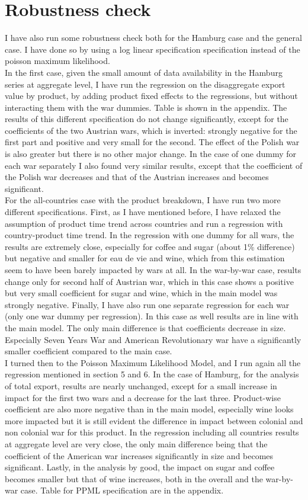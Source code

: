 \documentclass[12pt,a4paper,titlepage,english]{article}
\begin{document}
\section{Robustness check}
I have also run some robustness check both for the Hamburg case and the general case. I have done so by using a log linear specification specification instead of the poisson maximum likelihood. \\
In the first case, given the small amount of data availability in the Hamburg series at aggregate level, I have run the regression on the disaggregate export value by product, by adding product fixed effects to the regressions, but without interacting them with the war dummies. Table is shown in the appendix. The results of this different specification do not change significantly, except for the coefficients of the two Austrian wars, which is inverted: strongly negative for the first part and positive and very small for the second. The effect of the Polish war is also greater but there is no other major change. In the case of one dummy for each war separately I also found very similar results, except that the coefficient of the Polish war decreases and that of the Austrian increases and becomes significant.\\
For the all-countries case with the product breakdown, I have run two more different specifications. First, as I have mentioned before, I have relaxed the assumption of product time trend across countries and run a regression with country-product time trend. In the regression with one dummy for all wars, the results are extremely close, especially for coffee and sugar (about 1\% difference) but negative and smaller for eau de vie and wine, which from this estimation seem to have been barely impacted by wars at all. In the war-by-war case, results change only for second half of Austrian war, which in this case shows a positive but very small coefficient for sugar and wine, which in the main model was strongly negative. Finally, I have also run one separate regression for each war (only one war dummy per regression). In this case as well results are in line with the main model. The only main difference is that coefficients decrease in size. Especially Seven Years War and American Revolutionary war  have a significantly smaller coefficient compared to the main case. \\
I turned then to the Poisson Maximum Likelihood Model, and I run again all the regression mentioned in section 5 and 6. In the case of Hamburg, for the analysis of total export, results are nearly unchanged, except for a small increase in impact for the first two wars and a decrease for the last three. Product-wise coefficient are also more negative than in the main model, especially wine looks more impacted but it is still evident the difference in impact between colonial and non colonial war for this product. In the regression including all countries results at aggregate level are very close, the only main difference being that the coefficient of the American war increases significantly in size and becomes significant. Lastly, in the analysis by good, the impact on sugar and coffee becomes smaller but that of wine increases, both in the overall and the war-by-war case. Table for PPML specification are in the appendix.
\end{document}
